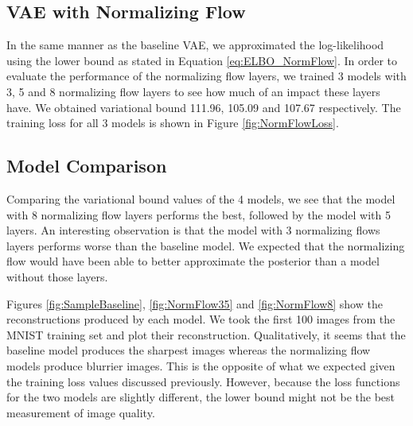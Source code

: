 \documentclass{article}
\begin{document}
\subsection{VAE with Normalizing Flow}
In the same manner as the baseline VAE, we approximated the log-likelihood using the lower bound
as stated in Equation \ref{eq:ELBO_NormFlow}. In order to evaluate the performance of the normalizing 
flow layers, we trained 3 models with 3, 5 and 8 normalizing flow layers to see how much of an impact 
these layers have. We obtained variational bound 111.96, 105.09 and 107.67 respectively.  The training
loss for all 3 models is shown in Figure \ref{fig:NormFlowLoss}.


\subsection{Model Comparison}
Comparing the variational bound values of the 4 models, we see that the model with 8 normalizing flow layers 
performs the best, followed by the model with 5 layers. An interesting observation is that the model with 
3 normalizing flows layers performs worse than the baseline model. We expected that the normalizing flow 
would have been able to better approximate the posterior than a model without those layers.

Figures \ref{fig:SampleBaseline}, \ref{fig:NormFlow35} and \ref{fig:NormFlow8} show the reconstructions 
produced by each model. We took the first 100 images from the MNIST training set and plot their reconstruction. 
Qualitatively, it seems that the baseline model produces the sharpest images whereas the normalizing flow 
models produce blurrier images. This is the opposite of what we expected given the training loss values discussed
previously. However, because the loss functions for the two models are slightly different, the lower bound might 
not be the best measurement of image quality.
\end{document}

